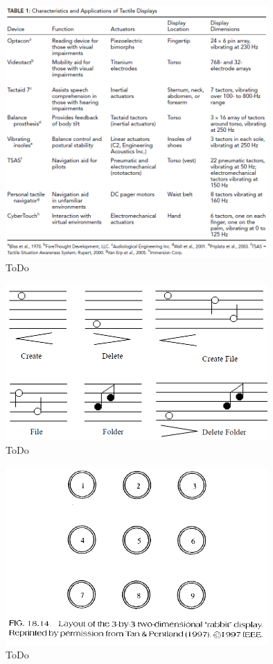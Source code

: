 \documentclass{llncs}					%
\begin{document}
\begin{figure}[htbp]
	\begin{center}
		\includegraphics[width = 10cm]{Grafiken/4-Uebersicht-Projekte.png}
		\caption{ToDo}
		\label{4-Uebersicht-Projekte}
	\end{center}
\end{figure}

\begin{figure}[htbp]
	\begin{center}
		\includegraphics[width = 10cm]{Grafiken/7-Tacton-Verwendungsbeispiel.png}
		\caption{ToDo}
		\label{7-Tacton-Verwendungsbeispiel}
	\end{center}
\end{figure}

\begin{figure}[htbp]
	\begin{center}
		\includegraphics[width = 10cm]{Grafiken/14-3x3-Grid.png}
		\caption{ToDo}
		\label{14-3x3-Grid}
	\end{center}
\end{figure}
\end{document}
